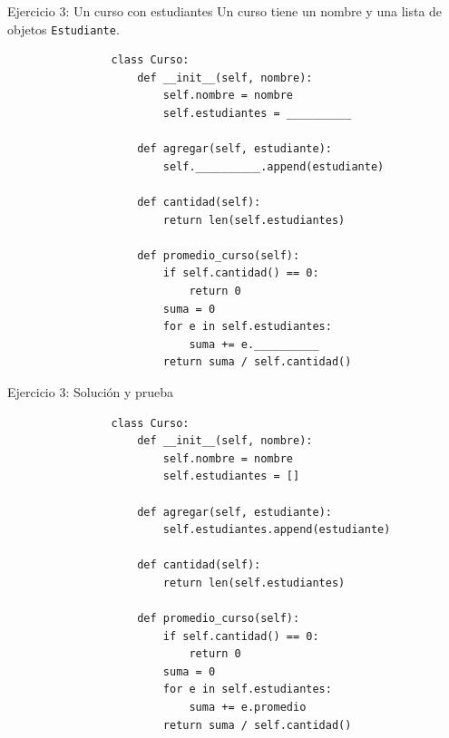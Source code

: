 \documentclass{beamer}
\begin{document}
    \begin{frame}[fragile,t]{Ejercicio 3: Un curso con estudiantes}
        Un curso tiene un nombre y una lista de objetos \texttt{Estudiante}.
        \begin{verbatim}
                class Curso:
                    def __init__(self, nombre):
                        self.nombre = nombre
                        self.estudiantes = __________
                
                    def agregar(self, estudiante):
                        self.__________.append(estudiante)
                
                    def cantidad(self):
                        return len(self.estudiantes)
                
                    def promedio_curso(self):
                        if self.cantidad() == 0:
                            return 0
                        suma = 0
                        for e in self.estudiantes:
                            suma += e.__________
                        return suma / self.cantidad()
        \end{verbatim}
    \end{frame}
    
    \begin{frame}[fragile,t]{Ejercicio 3: Solución y prueba}
        \begin{verbatim}
                class Curso:
                    def __init__(self, nombre):
                        self.nombre = nombre
                        self.estudiantes = []
                
                    def agregar(self, estudiante):
                        self.estudiantes.append(estudiante)
                
                    def cantidad(self):
                        return len(self.estudiantes)
                
                    def promedio_curso(self):
                        if self.cantidad() == 0:
                            return 0
                        suma = 0
                        for e in self.estudiantes:
                            suma += e.promedio
                        return suma / self.cantidad()
        \end{verbatim}
    \end{frame}
    
\end{document}
